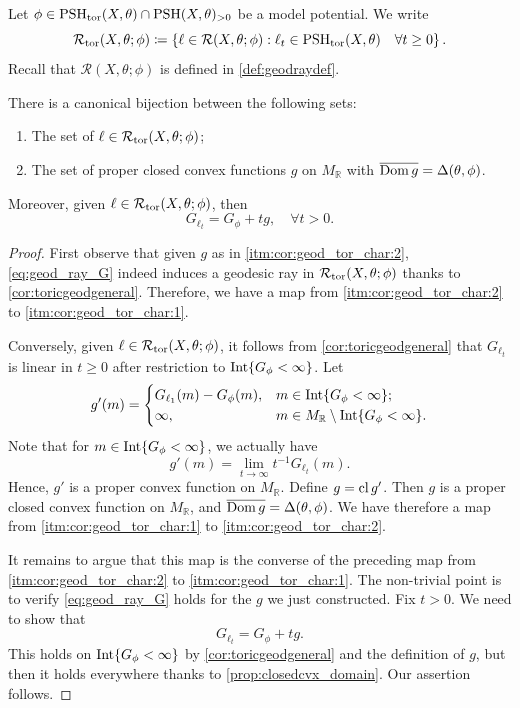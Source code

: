 Let $\phi\in \mathrm{PSH}_{\mathrm{tor}}(X,\theta)\cap \mathrm{PSH}(X,\theta)_{>0}$ be a model potential. We write
\[
\mathcal{R}_{\mathrm{tor}}(X,\theta;\phi)\coloneqq \left\{ \ell\in \mathcal{R}(X,\theta;\phi): \ell_t\in \mathrm{PSH}_{\mathrm{tor}}(X,\theta)\quad\forall t\geq 0\right\}.
\]
Recall that $\mathcal{R}(X,\theta;\phi)$ is defined in \cref{def:geodraydef}.
\begin{corollary}\label{cor:geod_tor_char}
There is a canonical bijection between the following sets:
\begin{enumerate}
    \item\label{itm:cor:geod_tor_char:1} The set of $\ell\in \mathcal{R}_{\mathrm{tor}}(X,\theta;\phi)$;
    \item\label{itm:cor:geod_tor_char:2} The set of proper closed convex functions $g$ on $M_{\mathbb{R}}$ with $\overline{\operatorname{Dom} g}=\Delta(\theta,\phi)$.
\end{enumerate}
Moreover, given $\ell\in \mathcal{R}_{\mathrm{tor}}(X,\theta;\phi)$, then
\begin{equation}\label{eq:geod_ray_G}
G_{\ell_t}=G_{\phi}+tg,\quad \forall t>0.
\end{equation}
\end{corollary}
\begin{proof}
    First observe that given $g$ as in \ref{itm:cor:geod_tor_char:2}, \eqref{eq:geod_ray_G} indeed induces a geodesic ray in $\mathcal{R}_{\mathrm{tor}}(X,\theta;\phi)$ thanks to \cref{cor:toricgeodgeneral}. Therefore, we have a map from \ref{itm:cor:geod_tor_char:2} to \ref{itm:cor:geod_tor_char:1}.

    Conversely, given $\ell\in \mathcal{R}_{\mathrm{tor}}(X,\theta;\phi)$, it follows from \cref{cor:toricgeodgeneral} that $G_{\ell_t}$ is linear in $t\geq 0$ after restriction to $\operatorname{Int} \{G_{\phi}<\infty\}$. Let
    \[
    g'(m)=
    \begin{cases}
    G_{\ell_1}(m)-G_{\phi}(m),& m\in \operatorname{Int} \{G_{\phi}<\infty\};\\
    \infty,& m\in M_{\mathbb{R}}\setminus \operatorname{Int} \{G_{\phi}<\infty\}.
    \end{cases}
    \]
    Note that for $m\in \operatorname{Int} \{G_{\phi}<\infty\}$, we actually have
    \[
    g'(m)=\lim_{t\to\infty}t^{-1}G_{\ell_t}(m).
    \]
    Hence, $g'$ is a proper convex function on $M_{\mathbb{R}}$.
    Define $g=\operatorname{cl} g'$. Then $g$ is a proper closed convex function on $M_{\mathbb{R}}$, and $\overline{\operatorname{Dom} g}=\Delta(\theta,\phi)$.
    We have therefore a map from \ref{itm:cor:geod_tor_char:1} to \ref{itm:cor:geod_tor_char:2}.

    It remains to argue that this map is the converse of the preceding map from \ref{itm:cor:geod_tor_char:2} to \ref{itm:cor:geod_tor_char:1}. The non-trivial point is to verify \eqref{eq:geod_ray_G} holds for the $g$ we just constructed. Fix $t>0$. We need to show that
    \[
    G_{\ell_t}=G_{\phi}+tg.
    \]
    This holds on $\operatorname{Int} \{G_{\phi}<\infty\}$ by \cref{cor:toricgeodgeneral} and the definition of $g$, but then it holds everywhere thanks to \cref{prop:closedcvx_domain}. Our assertion follows.
\end{proof}

